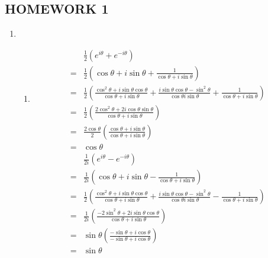 \documentclass[10pt]{article}
\begin{document}

\begin{centering}
  \section*{HOMEWORK 1}
\end{centering}

\begin{enumerate}
  \item 
    \begin{enumerate}
      \item 
      \begin{align*}
        &\frac{1}{2} \left(  e ^ {i \theta } + e ^ {- i \theta } \right) \\
        =& \frac{1}{2} \left( \cos \theta + i \sin \theta + \frac{1}{\cos \theta + i \sin \theta} \right) \\
        =& \frac{1}{2} \left( \frac{\cos ^2 \theta + i \sin \theta \cos \theta}{\cos \theta + i \sin \theta } + \frac{i \sin \theta \cos \theta - \sin ^2 \theta }{\cos \theta i \sin \theta } + \frac{1}{\cos \theta + i \sin \theta }   \right) \\
        =& \frac{1}{2} \left( \frac{2 \cos ^2 \theta + 2i \cos \theta \sin \theta }{\cos \theta + i \sin \theta } \right) \\
        =& \frac{2 \cos \theta }{2} \left( \frac{\cos \theta +i \sin \theta }{\cos \theta +i \sin \theta } \right) \\
        =& \cos  \theta 
      \end{align*}
      \begin{align*}
        &\frac{1}{2i} \left( e ^ {i \theta } - e ^ {-i \theta } \right) \\
        =& \frac{1}{2i} \left( \cos \theta +i\sin \theta - \frac{1}{\cos \theta +i\sin \theta } \right) \\
        =& \frac{1}{2} \left( \frac{\cos ^2 \theta + i \sin \theta \cos \theta}{\cos \theta + i \sin \theta } + \frac{i \sin \theta \cos \theta - \sin ^2 \theta }{\cos \theta i \sin \theta } - \frac{1}{\cos \theta + i \sin \theta }   \right) \\
        =& \frac{1}{2i} \left( \frac{-2\sin  ^2 \theta +2i\sin \theta \cos \theta }{\cos \theta +i\sin \theta } \right) \\
        =& \sin \theta \left( \frac{-\sin \theta + i\cos \theta }{-\sin \theta + i\cos \theta } \right) \\
        =& \sin \theta 

\end{align*}
\end{enumerate}
\end{enumerate}
\end{document}
